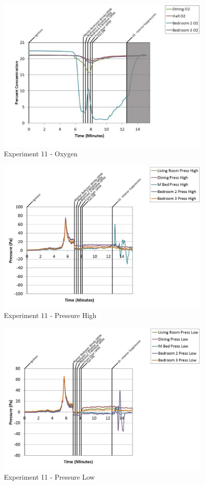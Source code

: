 \documentclass{article}
\begin{document}
\begin{appendices}
	\clearpage

	\begin{figure}[h!]
		\centering
		\includegraphics[height=3.05in]{0_Images/Results_Charts/Exp_11_Charts/Oxygen.pdf}
		\caption{Experiment 11 - Oxygen}
	\end{figure}
 

	\begin{figure}[h!]
		\centering
		\includegraphics[height=3.05in]{0_Images/Results_Charts/Exp_11_Charts/PressureHigh.pdf}
		\caption{Experiment 11 - Pressure High}
	\end{figure}
 
	\clearpage

	\begin{figure}[h!]
		\centering
		\includegraphics[height=3.05in]{0_Images/Results_Charts/Exp_11_Charts/PressureLow.pdf}
		\caption{Experiment 11 - Pressure Low}
	\end{figure}
 


\end{appendices}
\end{document}
